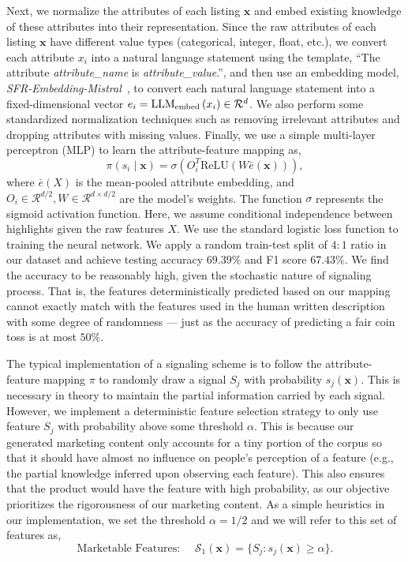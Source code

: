 Next, we normalize the attributes of each listing $\mathbf{x}$ and embed existing knowledge of these attributes into their representation. 
Since the raw attributes of each listing $\mathbf{x}$ have different value types (categorical, integer, float, etc.), we convert each attribute $x_i$ into a natural language statement using the template, ``The attribute \textit{attribute\_name} is \textit{attribute\_value}.'', 
and then use an embedding model, \textit{SFR-Embedding-Mistral}~\citep{meng2024sfrembedding}, to convert each natural language statement into a fixed-dimensional vector $e_i = \text{LLM}_{\text{embed}}\left(x_i\right) \in \mathcal{R}^d$. We also perform some standardized normalization techniques such as removing irrelevant attributes and dropping attributes with missing values.
Finally, we use a simple multi-layer perceptron (MLP) to learn the attribute-feature mapping as,
\begin{equation*}
    \pi\left(s_i \mid \mathbf{x}\right) = \sigma(O_i^T \text{ReLU}(W \bar{e}(\mathbf{x}))),
\end{equation*}
where $\bar{e}(X)$ is the mean-pooled attribute embedding, and $O_i \in \mathcal{R}^{d/2}, W \in \mathcal{R}^{d \times d/2}$ are the model's weights. The function $\sigma$ represents the sigmoid activation function. Here, we assume conditional independence between highlights given the raw features $X$.
We use the standard logistic loss function to training the neural network. 
We apply a random train-test split of $4:1$ ratio in our dataset and achieve testing accuracy $69.39\%$ and F1 score $67.43\%$. We find the accuracy to be reasonably high, given the stochastic nature of signaling process. That is, the features deterministically predicted based on our mapping cannot exactly match with the features used in the human written description with some degree of randomness --- just as the accuracy of predicting a fair coin toss is at most $50\%$. 

The typical implementation of a signaling scheme is to follow the attribute-feature mapping $\pi$ to randomly draw a signal $S_j$ with probability $s_j(\mathbf{x})$. This is necessary in theory to maintain the partial information carried by each signal. 
However, we implement a deterministic feature selection strategy to only use feature $S_j$ with probability above some threshold $\alpha$. This is because our generated marketing content only accounts for a tiny portion of the corpus so that it should have almost no influence on people's perception of a feature (e.g., the partial knowledge inferred upon observing each feature).
This also ensures that the product would have the feature with high probability, as our objective prioritizes the rigorousness of our marketing content. 
As a simple heuristics in our implementation, we set the threshold $\alpha=1/2$ and we will refer to this set of features as, 
\begin{equation}\label{eq:marketable-feature-app}
     \text{Marketable Features: } \quad  \mathcal{S}_1(\mathbf{x}) = \{S_j:  s_j(\mathbf{x}) \geq \alpha \}.
 \end{equation} 

